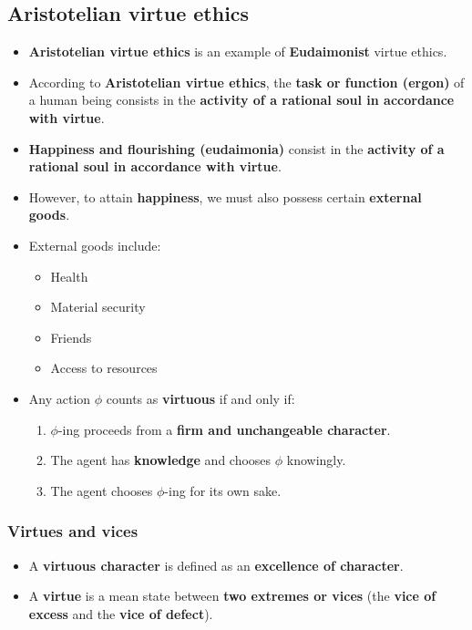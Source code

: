 \documentclass[11pt]{article}
\begin{document}
\subsection{Aristotelian virtue ethics}
\label{sec:orgd88cd2e}
\begin{itemize}
\item \textbf{Aristotelian virtue ethics} is an example of \textbf{Eudaimonist} virtue ethics.
\item According to \textbf{Aristotelian virtue ethics}, the \textbf{task or function (ergon)} of a human being consists in the \textbf{activity of a rational soul in accordance with virtue}.
\item \textbf{Happiness and flourishing (eudaimonia)} consist in the \textbf{activity of a rational soul in accordance with virtue}.
\item However, to attain \textbf{happiness}, we must also possess certain \textbf{external goods}.
\item External goods include:
\begin{itemize}
\item Health
\item Material security
\item Friends
\item Access to resources
\end{itemize}
\item Any action \(\phi\) counts as \textbf{virtuous} if and only if:
\begin{enumerate}
\item \(\phi\)-ing proceeds from a \textbf{firm and unchangeable character}.
\item The agent has \textbf{knowledge} and chooses \(\phi\) knowingly.
\item The agent chooses \(\phi\)-ing for its own sake.
\end{enumerate}
\end{itemize}
\subsubsection{Virtues and vices}
\label{sec:org8bb7e62}
\begin{itemize}
\item A \textbf{virtuous character} is defined as an \textbf{excellence of character}.
\item A \textbf{virtue} is a mean state between \textbf{two extremes or vices} (the \textbf{vice of excess} and the \textbf{vice of defect}).
\end{itemize}
\end{document}
